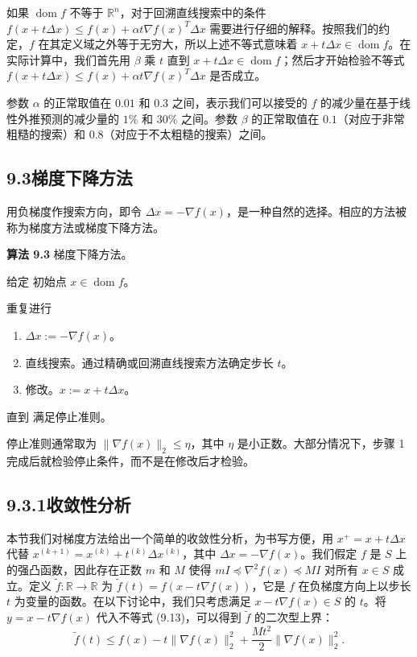 \documentclass[UTF8,12pt,a4paper,fontset=fandol]{ctexart}
\begin{document}
如果 $\operatorname{dom} f$ 不等于 $\mathbb{R}^n$，对于回溯直线搜索中的条件 $f(x+t\Delta x)\leq f(x)+\alpha t\nabla f(x)^T\Delta x$ 需要进行仔细的解释。按照我们的约定，$f$ 在其定义域之外等于无穷大，所以上述不等式意味着 $x+t\Delta x\in\operatorname{dom} f$。在实际计算中，我们首先用 $\beta$ 乘 $t$ 直到 $x+t\Delta x\in\operatorname{dom} f$；然后才开始检验不等式 $f(x+t\Delta x)\leq f(x)+\alpha t\nabla f(x)^T\Delta x$ 是否成立。

参数 $\alpha$ 的正常取值在 $0.01$ 和 $0.3$ 之间，表示我们可以接受的 $f$ 的减少量在基于线性外推预测的减少量的 $1\%$ 和 $30\%$ 之间。参数 $\beta$ 的正常取值在 $0.1$（对应于非常粗糙的搜索）和 $0.8$（对应于不太粗糙的搜索）之间。

\subsection*{9.3\quad 梯度下降方法}

用负梯度作搜索方向，即令 $\Delta x=-\nabla f(x)$，是一种自然的选择。相应的方法被称为梯度方法或梯度下降方法。

\noindent\textbf{算法 9.3}\quad
梯度下降方法。

给定 初始点 $x\in\operatorname{dom} f$。

重复进行
\begin{enumerate}
\item $\Delta x:=-\nabla f(x)$。
\item 直线搜索。通过精确或回溯直线搜索方法确定步长 $t$。
\item 修改。$x:=x+t\Delta x$。
\end{enumerate}
直到 满足停止准则。

停止准则通常取为 $\|\nabla f(x)\|_2\leq\eta$，其中 $\eta$ 是小正数。大部分情况下，步骤 1 完成后就检验停止条件，而不是在修改后才检验。

\subsection*{9.3.1\quad 收敛性分析}

本节我们对梯度方法给出一个简单的收敛性分析，为书写方便，用 $x^+=x+t\Delta x$ 代替 $x^{(k+1)}=x^{(k)}+t^{(k)}\Delta x^{(k)}$，其中 $\Delta x=-\nabla f(x)$。我们假定 $f$ 是 $S$ 上的强凸函数，因此存在正数 $m$ 和 $M$ 使得 $mI\preceq\nabla^2 f(x)\preceq MI$ 对所有 $x\in S$ 成立。定义 $\tilde{f}:\mathbb{R}\to\mathbb{R}$ 为 $\tilde{f}(t)=f(x-t\nabla f(x))$，它是 $f$ 在负梯度方向上以步长 $t$ 为变量的函数。在以下讨论中，我们只考虑满足 $x-t\nabla f(x)\in S$ 的 $t$。将 $y=x-t\nabla f(x)$ 代入不等式 (9.13)，可以得到 $\tilde{f}$ 的二次型上界：
\begin{equation}
\tilde{f}(t)\leq f(x)-t\|\nabla f(x)\|_2^2+\frac{Mt^2}{2}\|\nabla f(x)\|_2^2.
\tag{9.17}
\end{equation}
\end{document}
